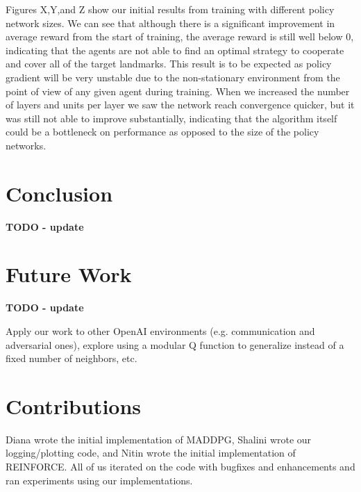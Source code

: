 \documentclass{article}
\begin{document}
Figures X,Y,and Z show our initial results from training with different policy network sizes. We can see that although there is a significant improvement in average reward from the start of training, the average reward is still well below 0, indicating that the agents are not able to find an optimal strategy to cooperate and cover all of the target landmarks. This result is to be expected as policy gradient will be very unstable due to the non-stationary environment from the point of view of any given agent during training. When we increased the number of layers and units per layer we saw the network reach convergence quicker, but it was still not able to improve substantially, indicating that the algorithm itself could be a bottleneck on performance as opposed to the size of the policy networks.

\section{Conclusion}
\textbf{TODO - update}

\section{Future Work}
\textbf{TODO - update}

Apply our work to other OpenAI environments (e.g. communication and adversarial ones), explore using a modular Q function to generalize instead of a fixed number of neighbors, etc.

\section*{Contributions}
Diana wrote the initial implementation of MADDPG, Shalini wrote our logging/plotting code, and Nitin wrote the initial implementation of REINFORCE. All of us iterated on the code with bugfixes and enhancements and ran experiments using our implementations.



\end{document}
